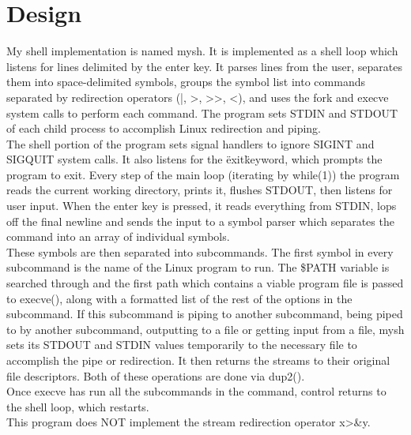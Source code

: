 \documentclass[11pt]{article}
\begin{document}
\section{Design}
My shell implementation is named mysh. It is implemented as a shell loop which listens for lines delimited by the enter key. It parses lines from the user, 
separates them into space-delimited symbols, groups the symbol list into commands separated by redirection operators (|, >, >>, <), and uses the fork and execve
system calls to perform each command. The program sets STDIN and STDOUT of each child process to accomplish Linux redirection and piping.\\
The shell portion of the program sets signal handlers to ignore SIGINT and SIGQUIT system calls. It also listens for the \"exit\" keyword, which prompts the 
program to exit. Every step of the main loop (iterating by while(1)) the program reads the current working directory, prints it, flushes STDOUT, then listens for
user input. When the enter key is pressed, it reads everything from STDIN, lops off the final newline and sends the input to a symbol parser which separates the
command into an array of individual symbols. \\
These symbols are then separated into subcommands. The first symbol in every subcommand is the name of the Linux program to run. The \${PATH} variable is searched
through and the first path which contains a viable program file is passed to execve(), along with a formatted list of the rest of the options in the subcommand.
If this subcommand is piping to another subcommand, being piped to by another subcommand, outputting to a file or getting input from a file, mysh sets its 
STDOUT and STDIN values temporarily to the necessary file to accomplish the pipe or redirection. It then returns the streams to their original file descriptors.
Both of these operations are done via dup2(). \\
Once execve has run all the subcommands in the command, control returns to the shell loop, which restarts. \\
This program does NOT implement the stream redirection operator x>&y. 
\end{document}
